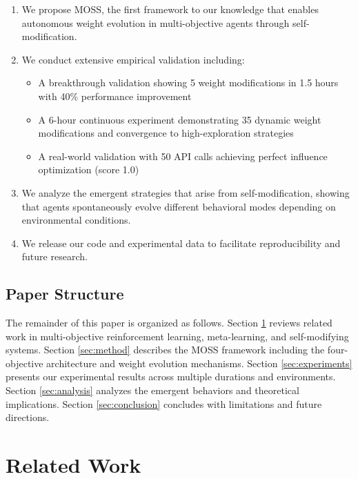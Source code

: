 \documentclass{article}
\begin{document}
\begin{enumerate}
    \item We propose MOSS, the first framework to our knowledge that enables autonomous weight evolution in multi-objective agents through self-modification.
    
    \item We conduct extensive empirical validation including:
    \begin{itemize}
        \item A breakthrough validation showing 5 weight modifications in 1.5 hours with 40\% performance improvement
        \item A 6-hour continuous experiment demonstrating 35 dynamic weight modifications and convergence to high-exploration strategies
        \item A real-world validation with 50 API calls achieving perfect influence optimization (score 1.0)
    \end{itemize}
    
    \item We analyze the emergent strategies that arise from self-modification, showing that agents spontaneously evolve different behavioral modes depending on environmental conditions.
    
    \item We release our code and experimental data to facilitate reproducibility and future research.
\end{enumerate}

\subsection{Paper Structure}

The remainder of this paper is organized as follows. Section \ref{sec:related} reviews related work in multi-objective reinforcement learning, meta-learning, and self-modifying systems. Section \ref{sec:method} describes the MOSS framework including the four-objective architecture and weight evolution mechanisms. Section \ref{sec:experiments} presents our experimental results across multiple durations and environments. Section \ref{sec:analysis} analyzes the emergent behaviors and theoretical implications. Section \ref{sec:conclusion} concludes with limitations and future directions.

\section{Related Work}
\label{sec:related}
\end{document}
